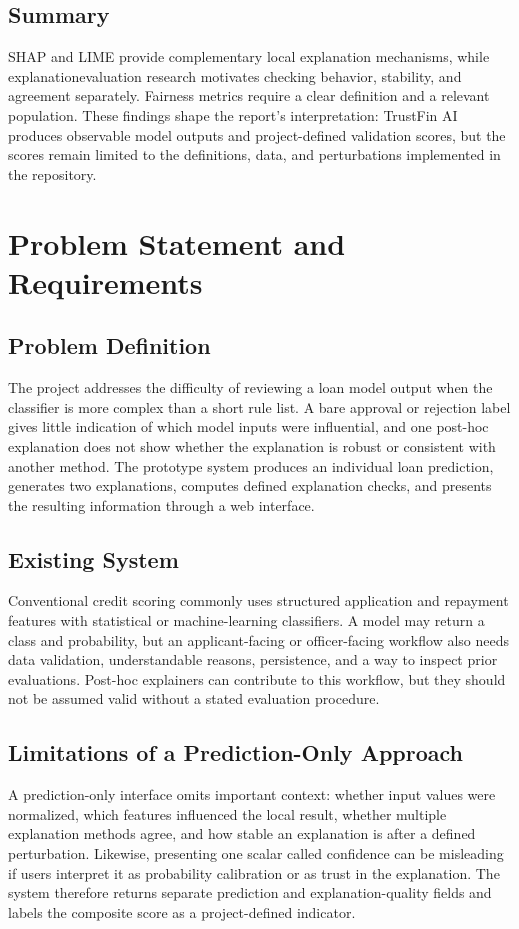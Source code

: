 \documentclass[12pt,a4paper]{report}
\begin{document}
\section{Summary}
SHAP and LIME provide complementary local explanation mechanisms, while explanationevaluation research motivates checking behavior, stability, and agreement separately. Fairness metrics require a clear definition and a relevant population. These findings shape the report’s interpretation: TrustFin AI produces observable model outputs and project-defined validation scores, but the scores remain limited to the definitions, data, and perturbations implemented in the repository.

\chapter{Problem Statement and Requirements}
\section{Problem Definition}
The project addresses the difficulty of reviewing a loan model output when the classifier is more complex than a short rule list. A bare approval or rejection label gives little indication of which model inputs were influential, and one post-hoc explanation does not show whether the explanation is robust or consistent with another method. The prototype system produces an individual loan prediction, generates two explanations, computes defined explanation checks, and presents the resulting information through a web interface.

\section{Existing System}
Conventional credit scoring commonly uses structured application and repayment features with statistical or machine-learning classifiers. A model may return a class and probability, but an applicant-facing or officer-facing workflow also needs data validation, understandable reasons, persistence, and a way to inspect prior evaluations. Post-hoc explainers can contribute to this workflow, but they should not be assumed valid without a stated evaluation procedure.

\section{Limitations of a Prediction-Only Approach}
A prediction-only interface omits important context: whether input values were normalized, which features influenced the local result, whether multiple explanation methods agree, and how stable an explanation is after a defined perturbation. Likewise, presenting one scalar called confidence can be misleading if users interpret it as probability calibration or as trust in the explanation. The system therefore returns separate prediction and explanation-quality fields and labels the composite score as a project-defined indicator.
\end{document}
